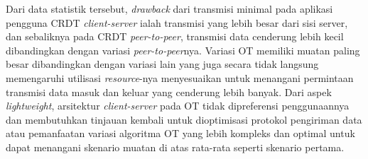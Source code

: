 Dari data statistik tersebut, \textit{drawback} dari transmisi minimal pada aplikasi pengguna CRDT \textit{client-server} ialah transmisi yang lebih besar dari sisi server, dan sebaliknya pada CRDT \textit{peer-to-peer}, transmisi data cenderung lebih kecil dibandingkan dengan variasi \textit{peer-to-peer}nya. Variasi OT memiliki muatan paling besar dibandingkan dengan variasi lain yang juga secara tidak langsung memengaruhi utilisasi \textit{resource}-nya menyesuaikan untuk menangani permintaan transmisi data masuk dan keluar yang cenderung lebih banyak. Dari aspek \textit{lightweight}, arsitektur \textit{client-server} pada OT tidak dipreferensi penggunaannya dan membutuhkan tinjauan kembali untuk dioptimisasi protokol pengiriman data atau pemanfaatan variasi algoritma OT yang lebih kompleks dan optimal untuk dapat menangani skenario muatan di atas rata-rata seperti skenario pertama.
